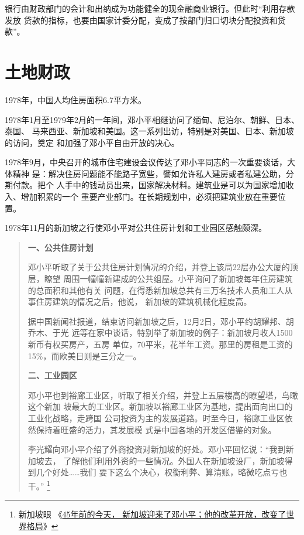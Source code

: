 银行由财政部门的会计和出纳成为功能健全的现金融商业银行。但此时“利用存款发放
贷款的指标，也要由国家计委分配，变成了按部门归口切块分配投资和贷款”。



\section{土地财政}
\label{sec:80tudi}


1978年，中国人均住房面积6.7平方米。

1978年1月至1979年2月的一年间，邓小平相继访问了缅甸、尼泊尔、朝鲜、日本、泰国、
马来西亚、新加坡和美国。这一系列出访，特别是对美国、日本、新加坡的访问，奠定
和加强了邓小平自由开放的决心。

1978年9月，中央召开的城市住宅建设会议传达了邓小平同志的一次重要谈话，大体精神
是：解决住房问题能不能路子宽些，譬如允许私人建房或者私建公助，分期付款。把个
人手中的钱动员出来，国家解决材料。建筑业是可以为国家增加收入、增加积累的一个
重要产业部门。在长期规划中，必须把建筑业放在重要位置。

1978年11月的新加坡之行使邓小平对公共住房计划和工业园区感触颇深。
\begin{quotation}
  \textbf{一、公共住房计划}

  邓小平听取了关于公共住房计划情况的介绍，并登上该局22层办公大厦的顶层，瞭望
  周围一幢幢新建成的公共组屋。小平询问了新加坡每年住房建筑的总面积和其他有关
  问题，在得悉新加坡总共有三万名技术人员和工人从事住房建筑的情况之后，他说，
  新加坡的建筑机械化程度高。

  据中国新闻社报道，结束访问新加坡之后，12月2日，邓小平约胡耀邦、胡乔木、于光
  远等在家中谈话，特别举了新加坡的例子：新加坡月收人1500新币有权买房产，五房
  单位，70平米，花半年工资。那里的房租是工资的15\%，而欧美日则是三分之一。

  \textbf{二、工业园区}

  邓小平也到裕廊工业区，听取了相关介绍，并登上五层楼高的瞭望塔，鸟瞰这个新加
  坡最大的工业区。新加坡以裕廊工业区为基地，提出面向出口的工业化战略，走跨国
  公司投资为主的发展道路。时至今日，裕廊工业区依然保持着旺盛的活力，其发展模
  式是中国各地的开发区借鉴的对象。

  李光耀向邓小平介绍了外商投资对新加坡的好处。邓小平回忆说：“我到新加坡去，
  了解他们利用外资的一些情况。外国人在新加坡设厂，新加坡得到几个好处……我们
  要下这么个决心，权衡利弊、算清账，略微吃点亏也干。” \footnote{新加坡眼
    《\href{https://www.yan.sg/gaibianeshijiegejucbxiaopige/}{45年前的今天，
      新加坡迎来了邓小平；他的改革开放，改变了世界格局}》}
\end{quotation}

